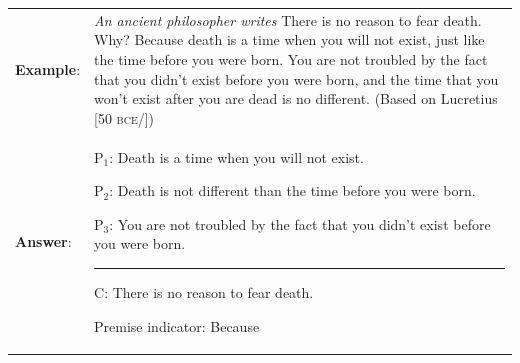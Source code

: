 \begin{longtabu}{p{.1\linewidth}p{.9\linewidth}}
\textbf{Example}: & \textit{An ancient philosopher writes} There is no reason to fear death. Why? Because death is a time when you will not exist, just like the time before you were born. You are not troubled by the fact that you didn't exist before you were born, and the time that you won't exist after you are dead is no different. (Based on Lucretius [50 \textsc{bce}/\citeyear{Lucretius2001}])\\
\textbf{Answer}: & 
\vspace{-16pt}
\begin{earg}
\item[P$_1$:] Death is a time when you will not exist.
\item[P$_2$:] Death is not different than the time before you were born. 
\item[P$_3$:] You are not troubled by the fact that you didn't exist before you were born.
\vspace{-.5em}
\item [] \rule{0.6\linewidth}{.5pt} 
\item[C:] There is no reason to fear death. 
\end{earg} 
Premise indicator: Because 
\\
\end{longtabu}
	
